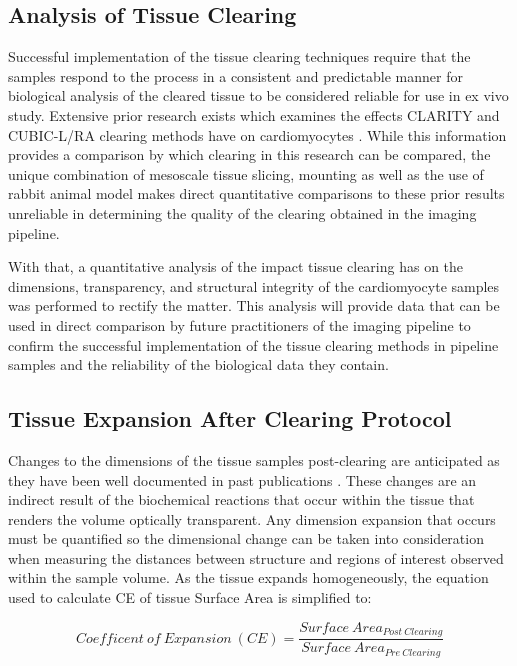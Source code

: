 \subsection{Analysis of Tissue Clearing}
Successful implementation of the tissue clearing techniques require that the samples respond to the process in a consistent and predictable manner for biological analysis of the cleared tissue to be considered reliable for use in ex vivo study. Extensive prior research exists which examines the effects CLARITY and CUBIC-L/RA clearing methods have on cardiomyocytes \cite{olianti_optical_2021, sands_its_2022, epp_optimization_2015}. While this information provides a comparison by which clearing in this research can be compared, the unique combination of mesoscale tissue slicing, mounting as well as the use of rabbit animal model makes direct quantitative comparisons to these prior results unreliable in determining the quality of the clearing obtained in the imaging pipeline.

With that, a quantitative analysis of the impact tissue clearing has on the dimensions, transparency, and structural integrity of the cardiomyocyte samples was performed to rectify the matter. This analysis will provide data that can be used in direct comparison by future practitioners of the imaging pipeline to confirm the successful implementation of the tissue clearing methods in pipeline samples and the reliability of the biological data they contain. 

\subsection{Tissue Expansion After Clearing Protocol}
Changes to the dimensions of the tissue samples post-clearing are anticipated as they have been well documented in past publications \cite{olianti_optical_2021, epp_optimization_2015}. These changes are an indirect result of the biochemical reactions that occur within the tissue that renders the volume optically transparent. Any dimension expansion that occurs must be quantified so the dimensional change can be taken into consideration when measuring the distances between structure and regions of interest observed within the sample volume. As the tissue expands homogeneously, the equation used to calculate CE of tissue Surface Area is simplified to:

\newline
\begin{equation}
Coefficent\ of\ Expansion\ (CE)= \frac{Surface\ Area_{Post\ Clearing}}{Surface\ Area_{Pre\ Clearing}} 
\end{equation}
\medskip

